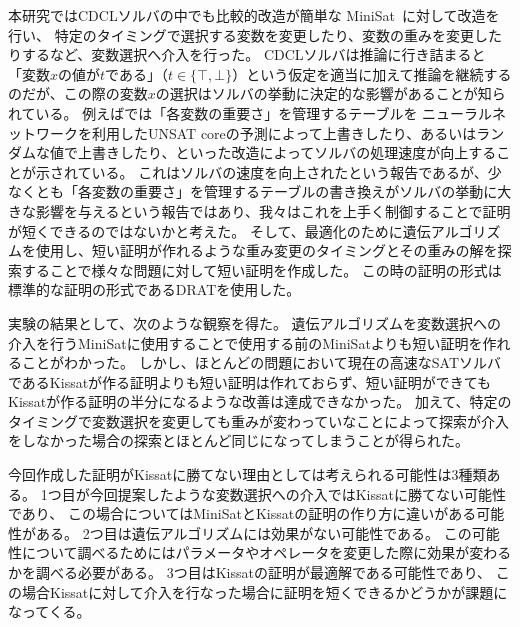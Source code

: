 

本研究ではCDCLソルバの中でも比較的改造が簡単な MiniSat~\cite{MINISAT}に対して改造を行い、
特定のタイミングで選択する変数を変更したり、変数の重みを変更したりするなど、変数選択へ介入を行った。
CDCLソルバは推論に行き詰まると「変数\( x \)の値が\( t \)である」（\( t \in \{ \top, \bot \} \)）という仮定を適当に加えて推論を継続するのだが、この際の変数\( x \)の選択はソルバの挙動に決定的な影響があることが知られている。
例えば\cite{neuralnet-vs-random-VSIDS}では「各変数の重要さ」を管理するテーブルを
ニューラルネットワークを利用したUNSAT coreの予測によって上書きしたり、あるいはランダムな値で上書きしたり、といった改造によってソルバの処理速度が向上することが示されている。
これはソルバの速度を向上されたという報告であるが、少なくとも「各変数の重要さ」を管理するテーブルの書き換えがソルバの挙動に大きな影響を与えるという報告ではあり、我々はこれを上手く制御することで証明が短くできるのではないかと考えた。
そして、最適化のために遺伝アルゴリズム\cite{GA}を使用し、短い証明が作れるような重み変更のタイミングとその重みの解を探索することで様々な問題に対して短い証明を作成した。
この時の証明の形式は標準的な証明の形式であるDRAT\cite{DRAT}を使用した。

実験の結果として、次のような観察を得た。
遺伝アルゴリズムを変数選択への介入を行うMiniSatに使用することで使用する前のMiniSatよりも短い証明を作れることがわかった。
しかし、ほとんどの問題において現在の高速なSATソルバであるKissatが作る証明よりも短い証明は作れておらず、短い証明ができてもKissatが作る証明の半分になるような改善は達成できなかった。
加えて、特定のタイミングで変数選択を変更しても重みが変わっていなことによって探索が介入をしなかった場合の探索とほとんど同じになってしまうことが得られた。

今回作成した証明がKissatに勝てない理由としては考えられる可能性は3種類ある。
1つ目が今回提案したような変数選択への介入ではKissatに勝てない可能性であり、
この場合についてはMiniSatとKissatの証明の作り方に違いがある可能性がある。
2つ目は遺伝アルゴリズムには効果がない可能性である。
この可能性について調べるためにはパラメータやオペレータを変更した際に効果が変わるかを調べる必要がある。
3つ目はKissatの証明が最適解である可能性であり、
この場合Kissatに対して介入を行なった場合に証明を短くできるかどうかが課題になってくる。